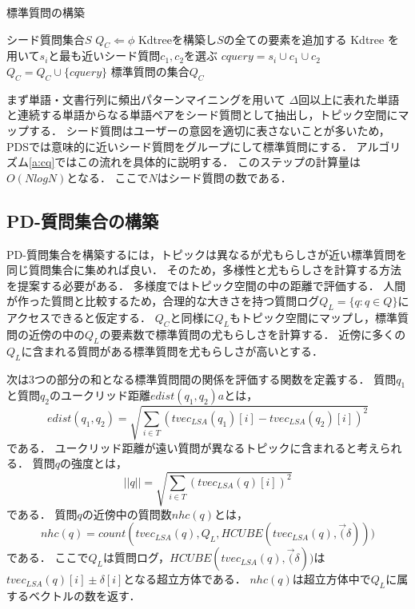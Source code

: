 \documentclass[master]{suribt}
\theoremstyle{definition}
\begin{document}
 \begin{algorithm}
 \caption{標準質問の構築}
 \begin{algorithmic}[1]
  \Require シード質問集合$S$
  \State $Q_C \Leftarrow \phi$
  \State Kdtreeを構築し$S$の全ての要素を追加する
  \State Kdtree を用いて$s_i$と最も近いシード質問$c_1,c_2$を選ぶ
  \State $cquery = s_i \cup c_1 \cup c_2$
  \State $Q_C = Q_C \cup \{cquery\}$
  \EndIf
  \EndFor
  \Ensure 標準質問の集合$Q_C$
 \end{algorithmic}
 \label{a:cq}
 \end{algorithm}

 まず単語・文書行列に頻出パターンマイニング\cite{apriori2010}を用いて
 $\Delta$回以上に表れた単語と連続する単語からなる単語ペアをシード質問として抽出し，トピック空間にマップする．
 シード質問はユーザーの意図を適切に表さないことが多いため，
 PDSでは意味的に近いシード質問をグループにして標準質問にする．
 アルゴリズム\ref{a:cq}ではこの流れを具体的に説明する．
 このステップの計算量は$O(NlogN)$となる．
 ここで$N$はシード質問の数である．

 \subsection{PD-質問集合の構築}
 PD-質問集合を構築するには，トピックは異なるが尤もらしさが近い標準質問を同じ質問集合に集めれば良い．
 そのため，多様性と尤もらしさを計算する方法を提案する必要がある．
 多様度ではトピック空間の中の距離で評価する．
 人間が作った質問と比較するため，合理的な大きさを持つ質問ログ$Q_L = \{q: q \in Q\}$にアクセスできると仮定する．
 $Q_C$と同様に$Q_L$もトピック空間にマップし，標準質問の近傍の中の$Q_L$の要素数で標準質問の尤もらしさを計算する．
 近傍に多くの$Q_L$に含まれる質問がある標準質問を尤もらしさが高いとする．

 次は3つの部分の和となる標準質問間の関係を評価する関数を定義する．
 質問$q_1$と質問$q_2$のユークリッド距離$edist(q_1,q_2)a$とは，
 \begin{equation}
 edist(q_1,q_2) = \sqrt{\sum_{i \in T}(tvec_{LSA}(q_1)[i] - tvec_{LSA}(q_2)[i])^2}
 \end{equation}
 である．
 ユークリッド距離が遠い質問が異なるトピックに含まれると考えられる．
 質問$q$の強度とは，
 \begin{equation}
 ||q|| = \sqrt{\sum_{i \in T}(tvec_{LSA}(q)[i])^2}
 \end{equation}
 である．
 質問$q$の近傍中の質問数$nhc(q)$とは，
 \begin{equation}
 nhc(q) = count(tvec_{LSA}(q),Q_L,HCUBE(tvec_{LSA}(q),\vec(\delta)))
 \end{equation}
 である．
 ここで$Q_L$は質問ログ，$HCUBE(tvec_{LSA}(q),\vec(\delta))$は$tvec_{LSA}(q)[i] \pm \delta[i]$となる超立方体である．
 $nhc(q)$は超立方体中で$Q_L$に属するベクトルの数を返す．
 
\end{document}

